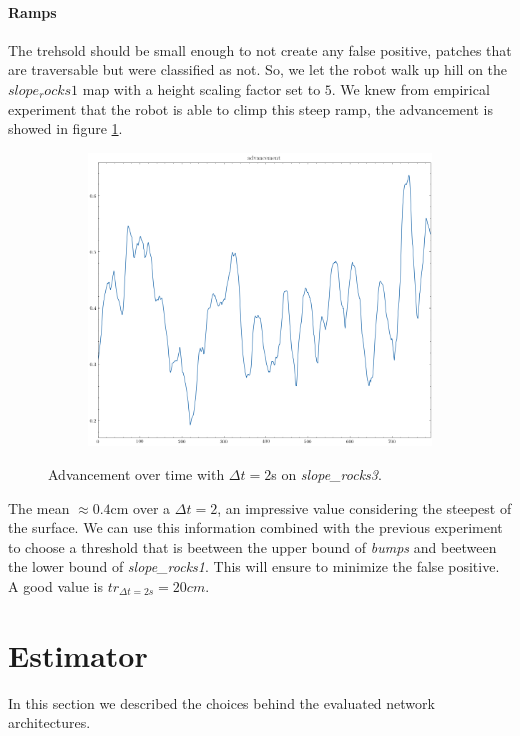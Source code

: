 \documentclass[../document.tex]{subfiles}
\begin{document}
\paragraph{Ramps}
The trehsold should be small enough to not create any false positive, patches that are traversable but were classified as not. So, we let the robot walk up hill on the $slope_rocks1$ map with a height scaling factor set to $5$. We knew from empirical experiment that the robot is able to climp this steep ramp, the advancement is showed in figure \ref{fig : krock-ramps-sim}.
\begin{figure}[htbp]
    \centering
    \begin{subfigure}[b]{0.45\textwidth}
        \includegraphics[width=\linewidth]{../img/3/find_tr/100-slope_rocks1}
    \end{subfigure}
    \caption{Advancement over time with $\Delta t = 2$s on \emph{slope\_rocks3}.}
    \label{fig : krock-ramps-sim}
\end{figure}
The mean $\approx 0.4$cm over a $\Delta t =2$, an impressive value considering the steepest of the surface. We can use this information combined with the previous experiment to choose a threshold that is beetween the upper bound of \emph{bumps} and beetween the lower bound of \emph{slope\_rocks1}. This will ensure to minimize the false positive. A good value is $tr_{\Delta t = 2s} = 20cm$. 

\section{Estimator}
\label{sec: estimator}
In this section we described the choices behind the evaluated network architectures.
\end{document}
